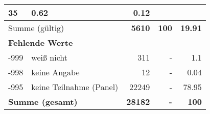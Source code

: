 \begin{longtable}{lXrrr}
       \num{35} &
       \num[round-mode=places,round-precision=2]{0,62} &
         \num[round-mode=places,round-precision=2]{0,12} \\
     \midrule
     \multicolumn{2}{l}{Summe (gültig)} &
       \textbf{\num{5610}} &
     \textbf{100} &
       \textbf{\num[round-mode=places,round-precision=2]{19,91}} \\
     \multicolumn{5}{l}{\textbf{Fehlende Werte}}\\
       -999 &
       weiß nicht &
         \num{311} &
        - &
         \num[round-mode=places,round-precision=2]{1,1} \\
       -998 &
       keine Angabe &
         \num{12} &
        - &
         \num[round-mode=places,round-precision=2]{0,04} \\
       -995 &
       keine Teilnahme (Panel) &
         \num{22249} &
        - &
         \num[round-mode=places,round-precision=2]{78,95} \\
     \midrule
     \multicolumn{2}{l}{\textbf{Summe (gesamt)}} &
          \textbf{\num{28182}} &
        \textbf{-} &
        \textbf{100} \\
     \bottomrule
     \end{longtable}
     
